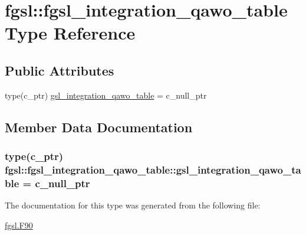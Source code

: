 \hypertarget{structfgsl_1_1fgsl__integration__qawo__table}{}\section{fgsl\+:\+:fgsl\+\_\+integration\+\_\+qawo\+\_\+table Type Reference}
\label{structfgsl_1_1fgsl__integration__qawo__table}
\subsection*{Public Attributes}
\begin{DoxyCompactItemize}
\item 
type(c\+\_\+ptr) \hyperlink{structfgsl_1_1fgsl__integration__qawo__table_a969624ba9782f8667be590e4863ea262}{gsl\+\_\+integration\+\_\+qawo\+\_\+table} = c\+\_\+null\+\_\+ptr
\end{DoxyCompactItemize}


\subsection{Member Data Documentation}
\hypertarget{structfgsl_1_1fgsl__integration__qawo__table_a969624ba9782f8667be590e4863ea262}{}
\subsubsection[{gsl\+\_\+integration\+\_\+qawo\+\_\+table}]{\setlength{\rightskip}{0pt plus 5cm}type(c\+\_\+ptr) fgsl\+::fgsl\+\_\+integration\+\_\+qawo\+\_\+table\+::gsl\+\_\+integration\+\_\+qawo\+\_\+table = c\+\_\+null\+\_\+ptr}\label{structfgsl_1_1fgsl__integration__qawo__table_a969624ba9782f8667be590e4863ea262}


The documentation for this type was generated from the following file\+:\begin{DoxyCompactItemize}
\item 
\hyperlink{fgsl_8F90}{fgsl.\+F90}\end{DoxyCompactItemize}

